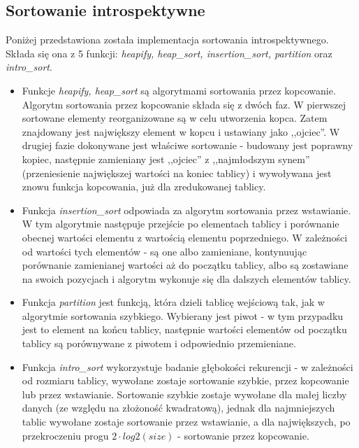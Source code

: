 \subsection{Sortowanie introspektywne}
Poniżej przedstawiona została implementacja sortowania introspektywnego. Składa się ona z 5 funkcji: \textit{heapify, heap\_sort, insertion\_sort, partition} oraz \textit{intro\_sort}.
\begin{itemize}
    \item Funkcje \textit{heapify, heap\_sort} są algorytmami sortowania przez kopcowanie. Algorytm sortowania przez kopcowanie składa się z dwóch faz. W pierwszej sortowane elementy reorganizowane są w celu utworzenia kopca. Zatem znajdowany jest największy element w kopcu i ustawiany jako ,,ojciec''. W drugiej fazie dokonywane jest właściwe sortowanie - budowany jest poprawny kopiec, następnie zamieniany jest ,,ojciec'' z ,,najmłodszym synem'' (przeniesienie największej wartości na koniec tablicy) i wywoływana jest znowu funkcja kopcowania, już dla zredukowanej tablicy. 
    \item Funkcja \textit{insertion\_sort} odpowiada za algorytm sortowania przez wstawianie. W tym algorytmie następuje przejście po elementach tablicy i porównanie obecnej wartości elementu z wartością elementu poprzedniego. W zależności od wartości tych elementów - są one albo zamieniane, kontynuując porównanie zamienianej wartości aż do początku tablicy, albo są zostawiane na swoich pozycjach i algorytm wykonuje się dla dalszych elementów tablicy.
    \item Funkcja \textit{partition} jest funkcją, która dzieli tablicę wejściową tak, jak w algorytmie sortowania szybkiego. Wybierany jest piwot - w tym przypadku jest to element na końcu tablicy, następnie wartości elementów od początku tablicy są porównywane z piwotem i odpowiednio przemieniane.
    \item Funkcja \textit{intro\_sort} wykorzystuje badanie głębokości rekurencji - w zależności od rozmiaru tablicy, wywołane zostaje sortowanie szybkie, przez kopcowanie lub przez wstawianie. Sortowanie szybkie zostaje wywołane dla małej liczby danych (ze względu na złożoność kwadratową), jednak dla najmniejszych tablic wywołane zostaje sortowanie przez wstawianie, a dla największych, po przekroczeniu progu $2 \cdot log2 (size)$ - sortowanie przez kopcowanie.
    
\end{itemize}

